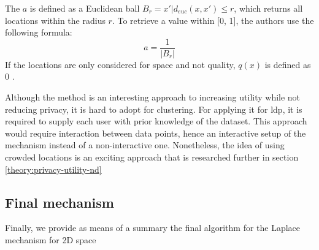 The $a$ is defined as a Euclidean ball $B_r = {x' | d_{euc}(x, x') \leq r}$, which returns all locations within the radius $r$.
To retrieve a value within [0, 1], the authors use the following formula:
\begin{equation}
  a = \frac{1}{|B_r|}
  \label{equation:privacy-mass-a}
\end{equation}
If the locations are only considered for space and not quality, $q(x)$ is defined as 0 \citep{chatzikokolakis_constructing_2015}.

Although the method is an interesting approach to increasing utility while not reducing privacy, it is hard to adopt for clustering.
For applying it for \gls{ldp}, it is required to supply each user with prior knowledge of the dataset.
This approach would require interaction between data points, hence an interactive setup of the mechanism instead of a non-interactive one. \newline
Nonetheless, the idea of using crowded locations is an exciting approach that is researched further in section \ref{theory:privacy-utility-nd}


\newpage
\subsection{Final mechanism}
Finally, we provide as means of a summary the final algorithm for the Laplace mechanism for 2D space

\newpage